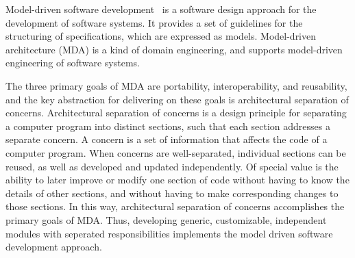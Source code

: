 	Model-driven software development~\cite{liddle2011model} is a software design approach for the development of software systems. It provides a set of guidelines for the structuring of specifications, which are expressed as models. Model-driven architecture (MDA) is a kind of domain engineering, and supports model-driven engineering of software systems.\par
	The three primary goals of MDA are portability, interoperability, and reusability, and the key abstraction for delivering on these goals is architectural separation of concerns. Architectural separation of concerns is a design principle for separating a computer program into distinct sections, such that each section addresses a separate concern. A concern is a set of information that affects the code of a computer program. When concerns are well-separated, individual sections can be reused, as well as developed and updated independently. Of special value is the ability to later improve or modify one section of code without having to know the details of other sections, and without having to make corresponding changes to those sections. In this way, architectural separation of concerns accomplishes the primary goals of MDA. Thus, developing generic, customizable, independent modules with seperated responsibilities implements the model driven software development approach.
  


